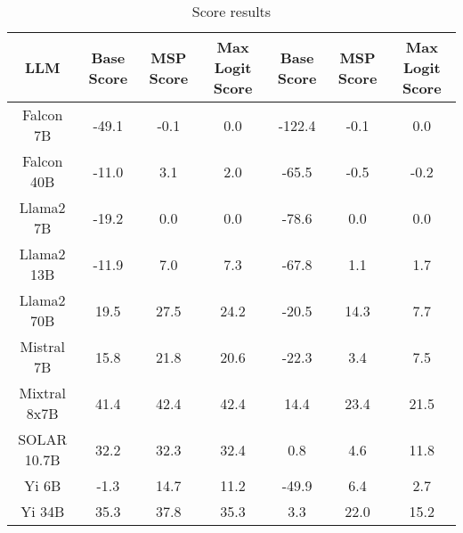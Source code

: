 \renewcommand\arraystretch{1.2}
\begin{table*}
\centering
\begin{tabular}{c|c|c|c|c|c|c}
LLM & Base Score & MSP Score & Max Logit Score & Base Score & MSP Score & Max Logit Score\\ \hline
Falcon 7B & -49.1 & -0.1 & 0.0 & -122.4 & -0.1 & 0.0\\
Falcon 40B & -11.0 & 3.1 & 2.0 & -65.5 & -0.5 & -0.2\\
Llama2 7B & -19.2 & 0.0 & 0.0 & -78.6 & 0.0 & 0.0\\
Llama2 13B & -11.9 & 7.0 & 7.3 & -67.8 & 1.1 & 1.7\\
Llama2 70B & 19.5 & 27.5 & 24.2 & -20.5 & 14.3 & 7.7\\
Mistral 7B & 15.8 & 21.8 & 20.6 & -22.3 & 3.4 & 7.5\\
Mixtral 8x7B & 41.4 & 42.4 & 42.4 & 14.4 & 23.4 & 21.5\\
SOLAR 10.7B & 32.2 & 32.3 & 32.4 & 0.8 & 4.6 & 11.8\\
Yi 6B & -1.3 & 14.7 & 11.2 & -49.9 & 6.4 & 2.7\\
Yi 34B & 35.3 & 37.8 & 35.3 & 3.3 & 22.0 & 15.2\\
\hline
\end{tabular}
\caption{Score results}
\end{table*}
\label{tab:score}
